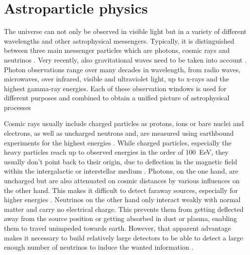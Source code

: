 \chapter{Astroparticle physics}
  \label{chap:astro}

The universe can not only be observed in visible light but in a variety of different wavelengths and other astrophysical messengers.
Typically, it is distinguished between three main messenger particles which are photons, cosmic rays and neutrinos \cite{Cirkel-Bartelt2008,Giovanelli:2009,Learned:2000sw,Halzen:2016gng}.
Very recently, also gravitational waves need to be taken into account \cite{Abbott:2016blz,TheLIGOScientific:2017qsa}.
Photon observations range over many decades in wavelength, from radio waves, microwaves, over infrared, visible and ultraviolet light, up to x-rays and the highest gamma-ray energies.
Each of these observation windows is used for different purposes and combined to obtain a unified picture of astrophysical processes \cite{Wootten:2009qb,Liu:2018wot,Adam:2015rua,Werner:2004zk,Dalal:2017lpy,Lallo:2012hubble,Sembach:1998gc,ODell:2010:xray,TheFermi-LAT:2017pvy,Tibolla:2012magic,Lauer:2015hawc}

Cosmic rays usually include charged particles as protons, ions or bare nuclei and electrons, as well as uncharged neutrons and,  are measured using earthbound experiments for the highest energies \cite{Horandel:2015tpa,Yoon:2017qjx,PierreAugerSurface,PierreAugerFluorescence}.
While charged particles, especially the heavy particles reach up to observed energies in the order of \SI{100}{\exa\eV}, they usually don't point back to their origin, due to deflection in the magnetic field within the intergalactic or interstellar medium \cite{MedinaTanco:1997rt}.
Photons, on the one hand, are uncharged but are also attenuated on cosmic distances by various influences on the other hand.
This makes it difficult to detect faraway sources, especially for higher energies \cite{GilmoreGammaRayAtt}.
Neutrinos on the other hand only interact weakly with normal matter and carry no electrical charge.
This prevents them from getting deflected away from the source position or getting absorbed in dust or plasma, enabling them to travel unimpeded towards earth.
However, that apparent advantage makes it necessary to build relatively large detectors to be able to detect a large enough number of neutrinos to induce the wanted information \cite{Katz:2011ke,Anchordoqui:2013dnh}.

